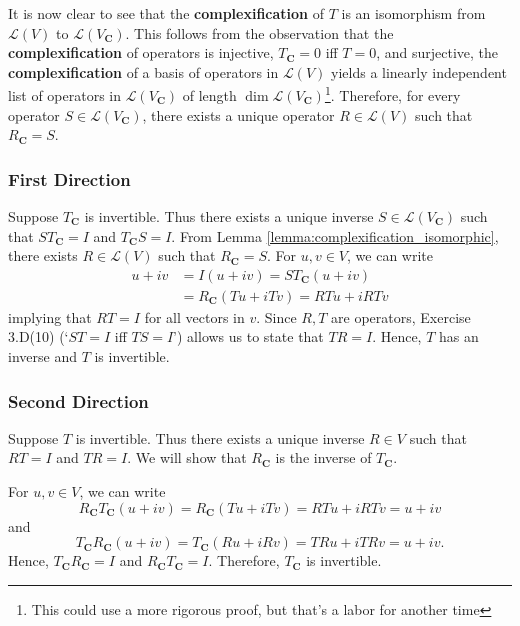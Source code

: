 \documentclass{article}
\begin{document}
It is now clear to see that the \textbf{complexification} of $T$ is an isomorphism from $\mathcal{L}(V)$ to $\mathcal{L}(V_{\mathbf{C}})$. 
This follows from the observation that the \textbf{complexification} of operators is injective, $T_{\mathbf{C}}=0$ iff $T=0$, and surjective, the \textbf{complexification} of a basis of operators in $\mathcal{L}(V)$ yields a linearly independent list of operators in $\mathcal{L}(V_{\mathbf{C}})$ of length $\operatorname{dim}\mathcal{L}(V_{\mathbf{C}})$\footnote{
This could use a more rigorous proof, but that's a labor for another time
}. 
Therefore, for every operator $S\in\mathcal{L}(V_{\mathbf{C}})$, there exists a unique operator $R\in\mathcal{L}(V)$ such that $R_{\mathbf{C}}=S$.

\subsubsection*{First Direction}
Suppose $T_{\mathbf{C}}$ is invertible. 
Thus there exists a unique inverse $S\in\mathcal{L}(V_{\mathbf{C}})$ such that $ST_{\mathbf{C}}=I$ and $T_{\mathbf{C}}S=I$. 
From Lemma \ref{lemma:complexification_isomorphic}, there exists $R\in\mathcal{L}(V)$ such that $R_{\mathbf{C}}=S$. 
For $u,v\in V$, we can write
\begin{align*}
    u+iv&=I(u+iv)=ST_{\mathbf{C}}(u+iv)\\
    &=R_{\mathbf{C}}(Tu+iTv)=RTu+iRTv
\end{align*}
implying that $RT=I$ for all vectors in $v$. 
Since $R,T$ are operators, Exercise 3.D(10) (`$ST=I$ iff $TS=I$') allows us to state that $TR=I$. 
Hence, $T$ has an inverse and $T$ is invertible.

\subsubsection*{Second Direction}
Suppose $T$ is invertible. Thus there exists a unique inverse $R\in V$ such that $RT=I$ and $TR=I$. 
We will show that $R_{\mathbf{C}}$ is the inverse of $T_{\mathbf{C}}$. 

For $u,v\in V$, we can write 
\begin{equation*}
    R_{\mathbf{C}}T_{\mathbf{C}}(u+iv)=R_{\mathbf{C}}(Tu+iTv)=RTu+iRTv=u+iv
\end{equation*}
and
\begin{equation*}
    T_{\mathbf{C}}R_{\mathbf{C}}(u+iv)=T_{\mathbf{C}}(Ru+iRv)=TRu+iTRv=u+iv.
\end{equation*}
Hence, $T_{\mathbf{C}}R_{\mathbf{C}}=I$ and $R_{\mathbf{C}}T_{\mathbf{C}}=I$. Therefore, $T_{\mathbf{C}}$ is invertible.
\end{document}
